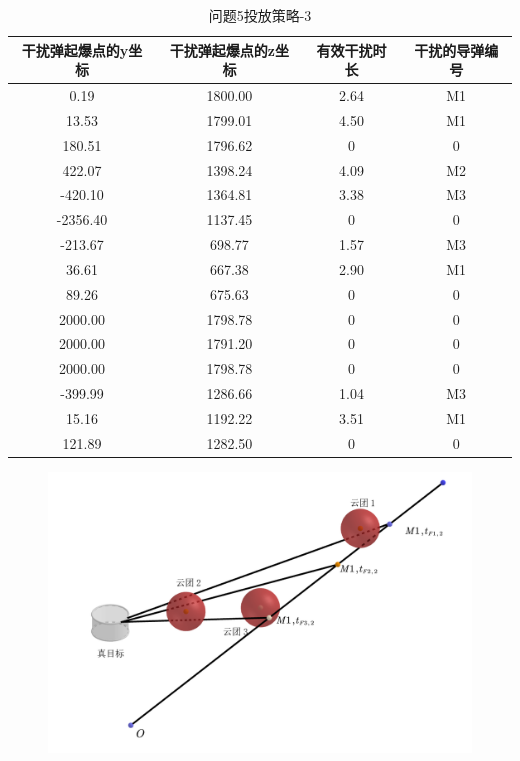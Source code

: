 \documentclass[../main.tex]{subfiles}
\begin{document}
\begin{table}[H]
\caption{问题5投放策略-3}
\label{tab:031} 
\centering
\begin{small}
\begin{tabular}{cccc}
\toprule[1.5pt]
干扰弹起爆点的y坐标&干扰弹起爆点的z坐标&有效干扰时长 &干扰的导弹编号\\
\midrule[1pt]
0.19    & 1800.00 & 2.64 & M1 \\
    13.53   & 1799.01 & 4.50 & M1 \\
    180.51  & 1796.62 & 0    & 0 \\
    422.07  & 1398.24 & 4.09 & M2 \\
    -420.10 & 1364.81 & 3.38 & M3 \\
    -2356.40& 1137.45 & 0    & 0 \\
    -213.67 & 698.77  & 1.57 & M3 \\
    36.61   & 667.38  & 2.90 & M1 \\
    89.26   & 675.63  & 0    & 0 \\
    2000.00 & 1798.78 & 0    & 0 \\
    2000.00 & 1791.20 & 0    & 0 \\
    2000.00 & 1798.78 & 0    & 0 \\
    -399.99 & 1286.66 & 1.04 & M3 \\
    15.16   & 1192.22 & 3.51 & M1 \\
    121.89  & 1282.50 & 0    & 0 \\             
\bottomrule[1.5pt]
\end{tabular}
\end{small}
\end{table}
\begin{figure}[H]
\centering
\includegraphics[scale=0.5]{图三.png}
\caption{}
\label{图3}
\end{figure}
\end{document}
